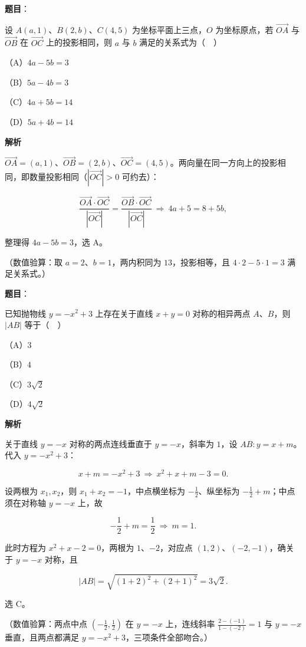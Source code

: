 \begin{answer}

\textbf{题目}：

设 $A(a,1)$、$B(2,b)$、$C(4,5)$ 为坐标平面上三点，$O$ 为坐标原点，若 $\overrightarrow{OA}$ 与 $\overrightarrow{OB}$ 在 $\overrightarrow{OC}$ 上的投影相同，则 $a$ 与 $b$ 满足的关系式为（　）

（A）$4a-5b=3$

（B）$5a-4b=3$

（C）$4a+5b=14$

（D）$5a+4b=14$

\textbf{解析}

$\overrightarrow{OA}=(a,1)$、$\overrightarrow{OB}=(2,b)$、$\overrightarrow{OC}=(4,5)$。两向量在同一方向上的投影相同，即数量投影相同（$|\overrightarrow{OC}|>0$ 可约去）：

\nopagebreak[4]
\[\frac{\overrightarrow{OA}\cdot\overrightarrow{OC}}{|\overrightarrow{OC}|}=\frac{\overrightarrow{OB}\cdot\overrightarrow{OC}}{|\overrightarrow{OC}|}\ \Longrightarrow\ 4a+5=8+5b,\]

整理得 $4a-5b=3$，选 A。

（数值验算：取 $a=2$、$b=1$，两内积同为 $13$，投影相等，且 $4\cdot2-5\cdot1=3$ 满足关系式。）


\end{answer}
\begin{answer}

\textbf{题目}：

已知抛物线 $y=-x^2+3$ 上存在关于直线 $x+y=0$ 对称的相异两点 $A$、$B$，则 $|AB|$ 等于（　）

（A）$3$

（B）$4$

（C）$3\sqrt2$

（D）$4\sqrt2$

\textbf{解析}

关于直线 $y=-x$ 对称的两点连线垂直于 $y=-x$，斜率为 $1$，设 $AB:y=x+m$。代入 $y=-x^{2}+3$：

\nopagebreak[4]
\[x+m=-x^{2}+3\ \Longrightarrow\ x^{2}+x+m-3=0 .\]

设两根为 $x_1,x_2$，则 $x_1+x_2=-1$，中点横坐标为 $-\frac12$、纵坐标为 $-\frac12+m$；中点须在对称轴 $y=-x$ 上，故

\nopagebreak[4]
\[-\frac12+m=\frac12\ \Longrightarrow\ m=1 .\]

此时方程为 $x^{2}+x-2=0$，两根为 $1$、$-2$，对应点 $(1,2)$、$(-2,-1)$，确关于 $y=-x$ 对称，且

\nopagebreak[4]
\[|AB|=\sqrt{(1+2)^{2}+(2+1)^{2}}=3\sqrt2 .\]

选 C。

（数值验算：两点中点 $\left(-\frac12,\frac12\right)$ 在 $y=-x$ 上，连线斜率 $\frac{2-(-1)}{1-(-2)}=1$ 与 $y=-x$ 垂直，且两点都满足 $y=-x^{2}+3$，三项条件全部吻合。）


\end{answer}
